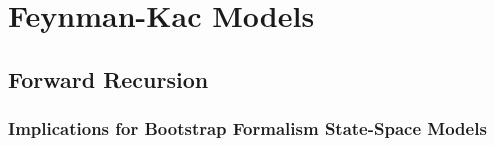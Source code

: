 \section{Feynman-Kac Models}
\subsection{Forward Recursion}



\subsubsection{Implications for Bootstrap Formalism State-Space Models}


